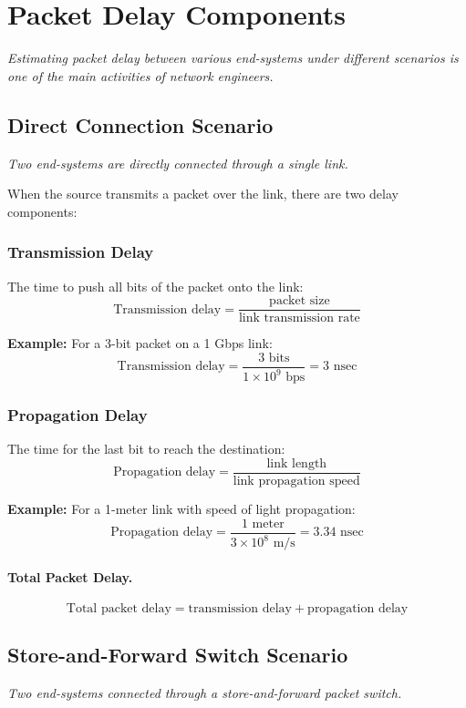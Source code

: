 \documentclass[../../compsys.tex]{subfiles}
\begin{document}
\section{Packet Delay Components}
\textit{Estimating packet delay between various end-systems under different scenarios is one of the main activities of network engineers.}

\subsection{Direct Connection Scenario}
\textit{Two end-systems are directly connected through a single link.}

When the source transmits a packet over the link, there are two delay components:

\subsubsection{Transmission Delay}
The time to push all bits of the packet onto the link:
\[
\text{Transmission delay} = \frac{\text{packet size}}{\text{link transmission rate}}
\]

\textbf{Example:} For a 3-bit packet on a 1 Gbps link:
\[
\text{Transmission delay} = \frac{3 \text{ bits}}{1 \times 10^9 \text{ bps}} = 3 \text{ nsec}
\]

\subsubsection{Propagation Delay}
The time for the last bit to reach the destination:
\[
\text{Propagation delay} = \frac{\text{link length}}{\text{link propagation speed}}
\]

\textbf{Example:} For a 1-meter link with speed of light propagation:
\[
\text{Propagation delay} = \frac{1 \text{ meter}}{3 \times 10^8 \text{ m/s}} = 3.34 \text{ nsec}
\]

\paragraph{Total Packet Delay.}
\[
\text{Total packet delay} = \text{transmission delay} + \text{propagation delay}
\]

\subsection{Store-and-Forward Switch Scenario}
\textit{Two end-systems connected through a store-and-forward packet switch.}
\end{document}
